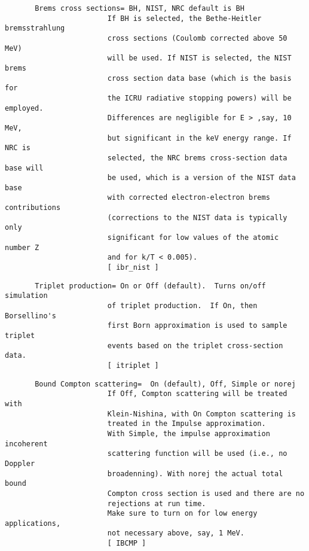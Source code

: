 \begin{verbatim}
       Brems cross sections= BH, NIST, NRC default is BH
                        If BH is selected, the Bethe-Heitler bremsstrahlung
                        cross sections (Coulomb corrected above 50 MeV)
                        will be used. If NIST is selected, the NIST brems
                        cross section data base (which is the basis for 
                        the ICRU radiative stopping powers) will be employed.
                        Differences are negligible for E > ,say, 10 MeV,
                        but significant in the keV energy range. If NRC is
                        selected, the NRC brems cross-section data base will
                        be used, which is a version of the NIST data base
                        with corrected electron-electron brems contributions
                        (corrections to the NIST data is typically only
                        significant for low values of the atomic number Z 
                        and for k/T < 0.005). 
                        [ ibr_nist ]
\end{verbatim}
\begin{verbatim}
       Triplet production= On or Off (default).  Turns on/off simulation
                        of triplet production.  If On, then Borsellino's
                        first Born approximation is used to sample triplet
                        events based on the triplet cross-section data.
                        [ itriplet ]
\end{verbatim}
\begin{verbatim}
       Bound Compton scattering=  On (default), Off, Simple or norej
                        If Off, Compton scattering will be treated with
                        Klein-Nishina, with On Compton scattering is
                        treated in the Impulse approximation. 
                        With Simple, the impulse approximation incoherent 
                        scattering function will be used (i.e., no Doppler
                        broadenning). With norej the actual total bound 
                        Compton cross section is used and there are no 
                        rejections at run time.
                        Make sure to turn on for low energy applications,
                        not necessary above, say, 1 MeV.
                        [ IBCMP ]
\end{verbatim}
